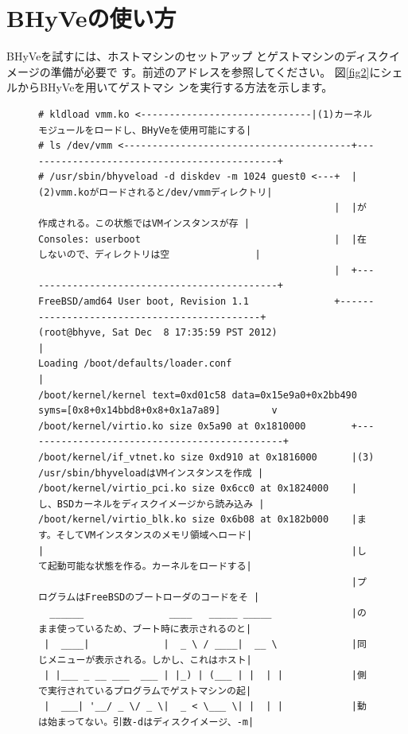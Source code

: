 \section{BHyVeの使い方}

 BHyVeを試すには、ホストマシンのセットアップ
とゲストマシンのディスクイメージの準備が必要で
す。前述のアドレスを参照してください。
 図\ref{fig2}にシェルからBHyVeを用いてゲストマシ
ンを実行する方法を示します。

\begin{figure}\centering
{\tiny
\begin{verbatim}
# kldload vmm.ko <------------------------------|(1)カーネルモジュールをロードし、BHyVeを使用可能にする|
# ls /dev/vmm <----------------------------------------+---------------------------------------------+
# /usr/sbin/bhyveload -d diskdev -m 1024 guest0 <---+  |(2)vmm.koがロードされると/dev/vmmディレクトリ|
                                                    |  |が作成される。この状態ではVMインスタンスが存 |
Consoles: userboot                                  |  |在しないので、ディレクトリは空               |
                                                    |  +---------------------------------------------+
FreeBSD/amd64 User boot, Revision 1.1               +---------------------------------------------+
(root@bhyve, Sat Dec  8 17:35:59 PST 2012)                                                        |
Loading /boot/defaults/loader.conf                                                                |
/boot/kernel/kernel text=0xd01c58 data=0x15e9a0+0x2bb490 syms=[0x8+0x14bbd8+0x8+0x1a7a89]         v
/boot/kernel/virtio.ko size 0x5a90 at 0x1810000        +----------------------------------------------+
/boot/kernel/if_vtnet.ko size 0xd910 at 0x1816000      |(3) /usr/sbin/bhyveloadはVMインスタンスを作成 |
/boot/kernel/virtio_pci.ko size 0x6cc0 at 0x1824000    |し、BSDカーネルをディスクイメージから読み込み |
/boot/kernel/virtio_blk.ko size 0x6b08 at 0x182b000    |ます。そしてVMインスタンスのメモリ領域へロード|
|                                                      |して起動可能な状態を作る。カーネルをロードする|
                                                       |プログラムはFreeBSDのブートローダのコードをそ |
  ______               ____   _____ _____              |のまま使っているため、ブート時に表示されるのと|
 |  ____|             |  _ \ / ____|  __ \             |同じメニューが表示される。しかし、これはホスト|
 | |___ _ __ ___  ___ | |_) | (___ | |  | |            |側で実行されているプログラムでゲストマシンの起|
 |  ___| '__/ _ \/ _ \|  _ < \___ \| |  | |            |動は始まってない。引数-dはディスクイメージ、-m|

\end{verbatim}}
\end{figure}
